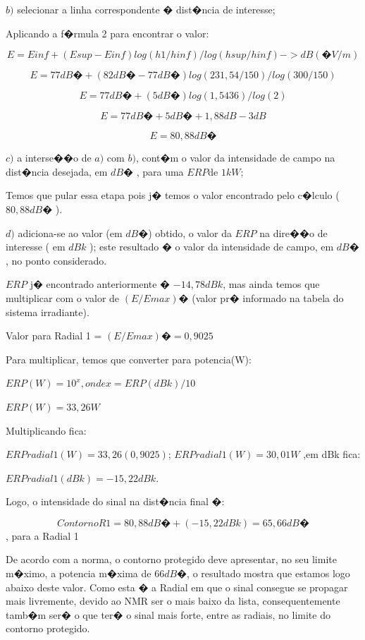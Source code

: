 $b)$ selecionar a linha correspondente � dist�ncia de interesse;

Aplicando a f�rmula 2 para encontrar o valor:

 $$E = Einf + ( Esup - Einf )log( h1 / hinf )/log( hsup / hinf )-> dB(�V / m)$$

 $$E = 77dB� + ( 82dB� - 77dB� )log( 231,54 / 150 )/log( 300 / 150 )$$

 $$E = 77dB� + ( 5dB� )log( 1,5436 )/log( 2 )$$

 $$E = 77dB� + 5dB� + 1,88 dB - 3 dB $$

 $$E = 80,88 dB�$$

$c)$ a interse��o de $a)$ com $b)$, cont�m o valor da intensidade de campo na dist�ncia desejada, em $dB�$
, para  uma $ERP$de $1 kW$;

 Temos que pular essa etapa pois j� temos o valor encontrado pelo c�lculo ( $80,88 dB�$ ).

$d)$ adiciona-se ao valor (em $dB�$) obtido, o valor da $ERP$ na dire��o de interesse ( em $dBk$ ); 
este resultado � o valor da intensidade de campo, em $dB�$, no ponto considerado. 

$ERP$ j� encontrado anteriormente � $-14,78 dBk$, mas ainda temos que multiplicar com o valor de $(E/Emax)�$ (valor pr� informado na tabela do sistema irradiante).

Valor para Radial 1 = $(E/Emax)� = 0,9025$

Para multiplicar, temos que converter para potencia(W):

  $ERP(W) = 10^x, onde x = ERP(dBk)/10$
  
  $ERP(W) = 33,26W$

Multiplicando fica:

  $ERPradial1(W) = 33,26(0,9025)$;
  $ERPradial1(W) = 30,01W$ ,em dBk fica:

  $ERPradial1(dBk) = -15,22dBk$.

Logo, o intensidade do sinal na dist�ncia final �:

$$ ContornoR1 = 80,88 dB� + (-15,22dBk) = 65,66 dB�$$ , para a Radial 1

De acordo com a norma, o contorno protegido deve apresentar, no seu limite m�ximo, a potencia m�xima de $66 dB�$, o resultado mostra que estamos logo abaixo deste valor. Como esta �
a Radial em que o sinal consegue se propagar mais livremente, devido ao NMR ser o mais baixo da lista, consequentemente tamb�m ser� o que ter� o sinal mais forte, entre as radiais, no limite
do contorno protegido.


